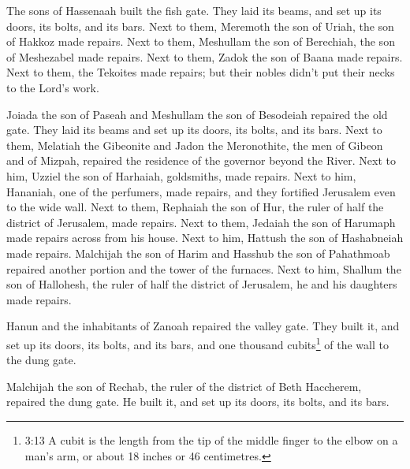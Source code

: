  The sons of Hassenaah built the fish gate. They laid its
beams, and set up its doors, its bolts, and its bars.  Next
to them, Meremoth the son of Uriah, the son of Hakkoz made repairs. Next
to them, Meshullam the son of Berechiah, the son of Meshezabel made
repairs. Next to them, Zadok the son of Baana made repairs. 
Next to them, the Tekoites made repairs; but their nobles didn't put
their necks to the Lord's work.

 Joiada the son of Paseah and Meshullam the son of Besodeiah
repaired the old gate. They laid its beams and set up its doors, its
bolts, and its bars.  Next to them, Melatiah the Gibeonite
and Jadon the Meronothite, the men of Gibeon and of Mizpah, repaired the
residence of the governor beyond the River.  Next to him,
Uzziel the son of Harhaiah, goldsmiths, made repairs. Next to him,
Hananiah, one of the perfumers, made repairs, and they fortified
Jerusalem even to the wide wall.  Next to them, Rephaiah the
son of Hur, the ruler of half the district of Jerusalem, made repairs.
 Next to them, Jedaiah the son of Harumaph made repairs
across from his house. Next to him, Hattush the son of Hashabneiah made
repairs.  Malchijah the son of Harim and Hasshub the son of
Pahathmoab repaired another portion and the tower of the furnaces.
 Next to him, Shallum the son of Hallohesh, the ruler of
half the district of Jerusalem, he and his daughters made repairs.

 Hanun and the inhabitants of Zanoah repaired the valley
gate. They built it, and set up its doors, its bolts, and its bars, and
one thousand cubits\footnote{3:13 A cubit is the length from the tip of
  the middle finger to the elbow on a man's arm, or about 18 inches or
  46 centimetres.} of the wall to the dung gate.

 Malchijah the son of Rechab, the ruler of the district of
Beth Haccherem, repaired the dung gate. He built it, and set up its
doors, its bolts, and its bars.

